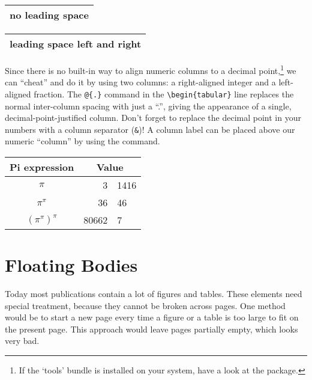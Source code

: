 \begin{example}
\begin{tabular}{@{} l @{}}
\hline 
no leading space\\
\hline
\end{tabular}
\end{example}

\begin{example}
\begin{tabular}{l}
\hline
leading space left and right\\
\hline
\end{tabular}
\end{example}

%
%

 Since there is no built-in way to align
numeric columns to a decimal point,\footnote{If the `tools' bundle is
  installed on your system, have a look at the  package.}
we can ``cheat'' and do it by using two columns: a right-aligned
integer and a left-aligned fraction. The \verb|@{.}| command in the
\verb|\begin{tabular}| line replaces the normal inter-column spacing with
just a ``.'', giving the appearance of a single,
decimal-point-justified column.  Don't forget to replace the decimal
point in your numbers with a column separator (\verb|&|)! A column label
can be placed above our numeric ``column'' by using the
 command.
 
\begin{example}
\begin{tabular}{c r @{.} l}
Pi expression       &
\multicolumn{2}{c}{Value} \\
\hline
$\pi$               & 3&1416  \\
$\pi^{\pi}$         & 36&46   \\
$(\pi^{\pi})^{\pi}$ & 80662&7 \\
\end{tabular}
\end{example}

\section{Floating Bodies}
Today most publications contain a lot of figures and tables. These
elements need special treatment, because they cannot be broken across
pages.  One method would be to start a new page every time a figure or
a table is too large to fit on the present page. This approach would
leave pages partially empty, which looks very bad.

